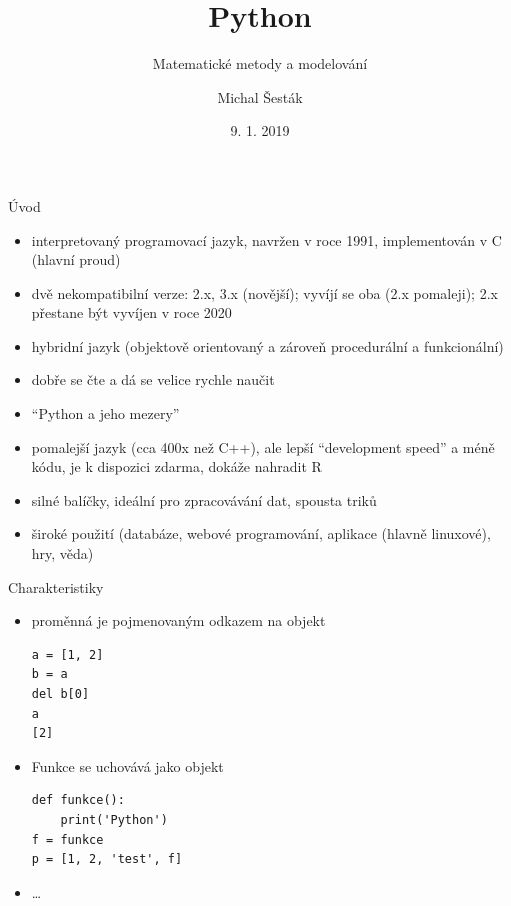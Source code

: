 \documentclass[10pt]{beamer}
\author{Michal Šesták}
\title{Python}
\subtitle{Matematické metody a modelování}
\date{9. 1. 2019}
\begin{document}
\small
\lstset{language=Python}
\maketitle


\begin{frame}{Úvod}
    \begin{itemize}
        \item interpretovaný programovací jazyk, navržen v roce 1991, implementován v C (hlavní proud)
        \item dvě nekompatibilní verze: 2.x, 3.x (novější); vyvíjí se oba (2.x pomaleji); 2.x přestane být vyvíjen v roce 2020
        \item hybridní jazyk (objektově orientovaný a zároveň procedurální a funkcionální)
        \item dobře se čte a dá se velice rychle naučit
        \item ``Python a jeho mezery''
        \item pomalejší jazyk (cca 400x než C++), ale lepší ``development speed'' a méně kódu, je k dispozici zdarma, dokáže nahradit R
        \item silné balíčky, ideální pro zpracovávání dat, spousta triků
        \item široké použití (databáze, webové programování, aplikace (hlavně linuxové), hry, věda) 
    \end{itemize}
\end{frame}

\begin{frame}[fragile]{Charakteristiky}
    \begin{itemize}
        \item proměnná je pojmenovaným odkazem na objekt
\begin{lstlisting}[columns=fullflexible]
a = [1, 2]
b = a
del b[0]
a
[2]
\end{lstlisting}
\item Funkce se uchovává jako objekt
    \begin{lstlisting}[columns=flexible]
def funkce():
    print('Python')
f = funkce
p = [1, 2, 'test', f]
\end{lstlisting}
\item \dots
    \end{itemize}
\end{frame}
\end{document}

